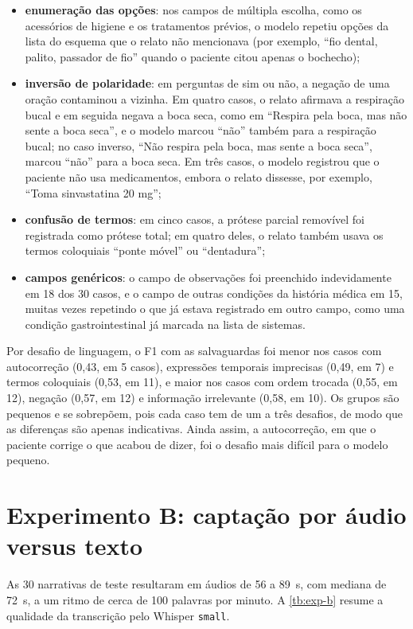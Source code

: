 \begin{itemize}
	\item \textbf{enumeração das opções}: nos campos de múltipla escolha, como os acessórios de higiene e os tratamentos prévios, o modelo repetiu opções da lista do esquema que o relato não mencionava (por exemplo, ``fio dental, palito, passador de fio'' quando o paciente citou apenas o bochecho);
	\item \textbf{inversão de polaridade}: em perguntas de sim ou não, a negação de uma oração contaminou a vizinha. Em quatro casos, o relato afirmava a respiração bucal e em seguida negava a boca seca, como em ``Respira pela boca, mas não sente a boca seca'', e o modelo marcou ``não'' também para a respiração bucal; no caso inverso, ``Não respira pela boca, mas sente a boca seca'', marcou ``não'' para a boca seca. Em três casos, o modelo registrou que o paciente não usa medicamentos, embora o relato dissesse, por exemplo, ``Toma sinvastatina 20 mg'';
	\item \textbf{confusão de termos}: em cinco casos, a prótese parcial removível foi registrada como prótese total; em quatro deles, o relato também usava os termos coloquiais ``ponte móvel'' ou ``dentadura'';
	\item \textbf{campos genéricos}: o campo de observações foi preenchido indevidamente em 18 dos 30 casos, e o campo de outras condições da história médica em 15, muitas vezes repetindo o que já estava registrado em outro campo, como uma condição gastrointestinal já marcada na lista de sistemas.
\end{itemize}

Por desafio de linguagem, o F1 com as salvaguardas foi menor nos casos com autocorreção (0,43, em 5 casos), expressões temporais imprecisas (0,49, em 7) e termos coloquiais (0,53, em 11), e maior nos casos com ordem trocada (0,55, em 12), negação (0,57, em 12) e informação irrelevante (0,58, em 10). Os grupos são pequenos e se sobrepõem, pois cada caso tem de um a três desafios, de modo que as diferenças são apenas indicativas. Ainda assim, a autocorreção, em que o paciente corrige o que acabou de dizer, foi o desafio mais difícil para o modelo pequeno.

\section{Experimento B: captação por áudio versus texto}

As 30 narrativas de teste resultaram em áudios de 56 a 89~s, com mediana de 72~s, a um ritmo de cerca de 100 palavras por minuto. A \autoref{tb:exp-b} resume a qualidade da transcrição pelo Whisper \texttt{small}.

